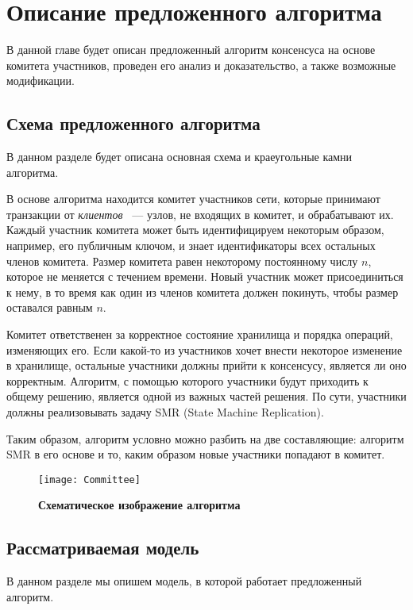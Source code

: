 
\chapter{Описание предложенного алгоритма}  \label{chapter2}
В данной главе будет описан предложенный алгоритм консенсуса на основе комитета участников, проведен его анализ и доказательство,
а также возможные модификации.

\section{Схема предложенного алгоритма}
В данном разделе будет описана основная схема и краеугольные камни алгоритма.

В основе алгоритма находится комитет участников сети, 
которые принимают транзакции от \textit{клиентов} ~--- узлов, не входящих в комитет, 
и обрабатывают их.
Каждый участник комитета может быть идентифицируем некоторым образом, например, его публичным ключом, и знает идентификаторы всех остальных членов комитета.
Размер комитета равен некоторому постоянному числу $n$, которое не меняется с течением времени. 
Новый участник может присоединиться к нему, в то время как один из членов комитета должен покинуть, чтобы размер оставался равным $n$.

Комитет ответственен за корректное состояние хранилища и порядка операций, изменяющих его.
Если какой-то из участников хочет внести некоторое изменение в хранилище, остальные участники должны прийти к консенсусу, является ли оно корректным. 
Алгоритм, с помощью которого участники будут приходить к общему решению, является одной из важных частей решения.  
По сути, участники должны реализовывать задачу SMR (State Machine Replication)\cite{Schneider:1990:IFS:98163.98167}.

Таким образом, алгоритм условно можно разбить на две составляющие: алгоритм SMR в его основе и то, каким образом новые участники попадают в комитет.

\begin{figure}[!h]
\texttt{[image: Committee]}
\caption{\textbf{Схематическое изображение алгоритма}}
\label{fig:committee}
\end{figure}

\section{Рассматриваемая модель}
В данном разделе мы опишем модель, в которой работает предложенный алгоритм.

